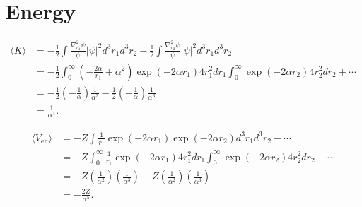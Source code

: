 \section{Energy}
\begin{align}
\langle K \rangle &= -\frac{1}{2}\int \frac{\nabla_{r_1}^2 \psi}{\psi} |\psi|^2 d^3 r_1 d^3 r_2 -\frac{1}{2}\int \frac{\nabla_{r_2}^2 \psi}{\psi} |\psi|^2 d^3 r_1 d^3 r_2 \\
&= -\frac{1}{2} \int_0^{\infty}  \left(-\frac{2 \alpha}{r_1} + \alpha^2\right) \exp(-2 \alpha r_1) 4 r_1^2 dr_1 \int_0^{\infty}\exp(-2 \alpha r_2) 4r_2^2 dr_2 + \cdots \\
&= -\frac{1}{2} \left(-\frac{1}{\alpha}\right) \frac{1}{\alpha^3} -\frac{1}{2} \left(-\frac{1}{\alpha}\right) \frac{1}{\alpha^3} \\
&= \boxed{\frac{1}{\alpha^4}}.
\end{align}

\begin{align}
\langle V_{\mathrm{en}} \rangle &= -Z\int \frac{1}{r_1} \exp(-2 \alpha r_1) \exp(-2 \alpha r_2) d^3 r_1 d^3 r_2 - \cdots \\
&= -Z\int_0^{\infty} \frac{1}{r_1} \exp(-2 \alpha r_1) 4r_1^2 dr_1 \int_0^{\infty} \exp(-2 \alpha r_2) 4 r_2^2 d r_2 - \cdots \\
&= -Z \left(\frac{1}{\alpha^2} \right) \left(\frac{1}{\alpha^3} \right) -Z \left(\frac{1}{\alpha^2} \right) \left(\frac{1}{\alpha^3} \right) \\
&= \boxed{-\frac{2Z}{\alpha^5}}.
\end{align}
